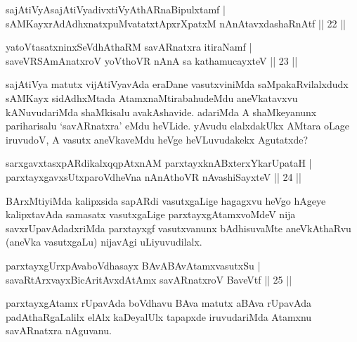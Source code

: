 
\begin{shl}
sajAtiVyAsajAtiVyadivxtiVyAthARnaBipulxtamf |\\
sAMKayxrAdAdhxnatxpuMvatatxtApxrXpatxM nAnAtavxdashaRnAtf \hfill || 22 ||
\end{shl}

\begin{shl}
yatoV\s tasatxninxSeVdhAthaRM savARnatxra itiraNamf |\\
saveVRSAmAnatxroV yoV\s thoVR nAnA sa kathamucayxteV \hfill || 23 ||
\end{shl}

\begin{artha}
sajAtiVya matutx vijAtiVyavAda eraDane vasutxviniMda saMpakaRvilalxdudx sAMKayx sidAdhxMtada AtamxnaMtirabahudeMdu
aneVkatavxvu kANuvudariMda shaMkisalu avakAshavide. adariMda A shaMkeyanunx pariharisalu `savARnatxra' eMdu heVLide. yAvudu elalxdakUkx AMtara oLage iruvudoV, A vasutx aneVkaveMdu heVge heVLuvudakekx Agutatxde?
\end{artha}


\begin{shl}
sarxgavxtasxpARdikalxqqpAtxnAM parxtayxknABxterxYkarUpataH |\\
parxtayxgavxsUtxparoVdheVna nAnAthoVR nAvashiSayxteV \hfill || 24 ||
\end{shl}

\begin{artha}%
BArxMtiyiMda kalipxsida sapARdi vasutxgaLige hagagxvu heVgo hAgeye kalipxtavAda samasatx vasutxgaLige parxtayxgAtamxvoMdeV nija savxrUpavAdadxriMda parxtayxgf vasutxvanunx bAdhisuvaMte aneVkAthaRvu (aneVka vasutxgaLu) nijavAgi uLiyuvudilalx.
\end{artha}


\begin{shl}
parxtayxgUrxpAvaboVdhasayx BAvABAvAtamxvasutxSu |\\
savaRtArxvayxBicAritAvxdAtAmx savARnatxroV BaveVtf \hfill || 25 ||
\end{shl}

\begin{artha}
parxtayxgAtamx rUpavAda boVdhavu BAva matutx aBAva rUpavAda padAthaRgaLalilx elAlx kaDeyalUlx tapapxde iruvudariMda 
Atamxnu savARnatxra nAguvanu.
\end{artha}

